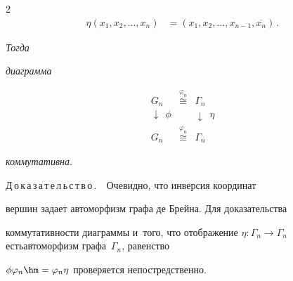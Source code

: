 \begin{multicols}{2}
\begin{align*}
  \eta\left(x_1,x_2,\ldots , x_n\right) &= \left( x_1, x_2,\ldots ,  


x_{n-1}, \overline{x_n}\right)\,.


  \end{align*}


\textit{Тогда} 




\textit{диаграмма} 


$$


\begin{array}{ccc}


G_n&\overset{\varphi_n}{\cong}&\Gamma_n\\[3pt]


\downarrow\ \ \phi & & \downarrow\ \ \eta\\[3pt]


G_n & \overset{\varphi_n}{\cong}&\Gamma_n


\end{array}


$$


\textit{коммутативна}.


  


  \smallskip


  


  \noindent


  Д\,о\,к\,а\,з\,а\,т\,е\,л\,ь\,с\,т\,в\,о\,.\ \ Очевидно, что инверсия координат 


вершин задает автоморфизм графа де Брейна. Для доказательства 


коммутативности диаграммы и~того, что отображение $\eta: \Gamma_n\to 


\Gamma_n$ есть\linebreak автоморфизм графа~$\Gamma_n$, равенство 


$\phi\varphi_n\hm=\varphi_n\eta$ проверяется непостредственно. 


  



\end{multicols}
